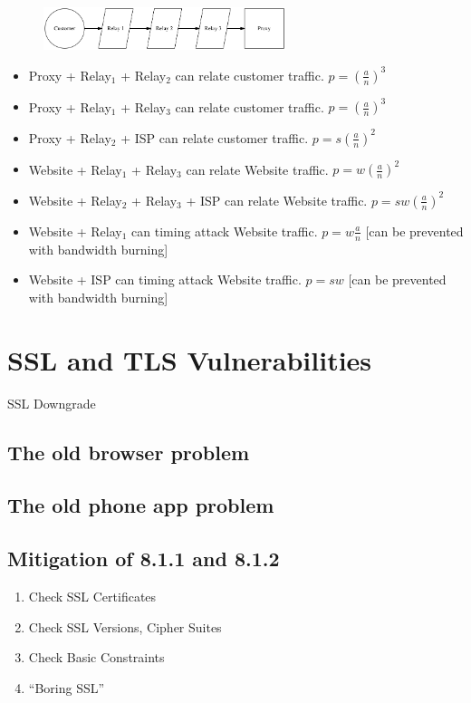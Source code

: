 \documentclass{article}
\begin{document}
\begin{figure}[htbp]
  \centering
  \includegraphics[width = 200pt]{stttc}
  \caption{}
\end{figure}

\begin{itemize}
\item Proxy + Relay$_1$ + Relay$_2$ can relate customer traffic. $p = (\frac{a}{n})^3$
\item Proxy + Relay$_1$ + Relay$_3$ can relate customer traffic. $p = (\frac{a}{n})^3$
\item Proxy + Relay$_2$ + ISP can relate customer traffic. $p = s(\frac{a}{n})^2$
\item Website + Relay$_1$ + Relay$_3$ can relate Website traffic. $p = w(\frac{a}{n})^2$
\item Website + Relay$_2$ + Relay$_3$ + ISP can relate Website traffic. $p = sw(\frac{a}{n})^2$
\item Website + Relay$_1$ can timing attack Website traffic. $p = w\frac{a}{n}$ [can be prevented with bandwidth burning]
\item Website + ISP can timing attack Website traffic. $p = sw$ [can be prevented with bandwidth burning]
\end{itemize}


\section{SSL and TLS Vulnerabilities}

SSL Downgrade

\subsection{The old browser problem}

\subsection{The old phone app problem}

\subsection{Mitigation of 8.1.1 and 8.1.2}

\begin{enumerate}
\item Check SSL Certificates
\item Check SSL Versions, Cipher Suites
\item Check Basic Constraints
\item “Boring SSL”
\end{enumerate}
\end{document}

